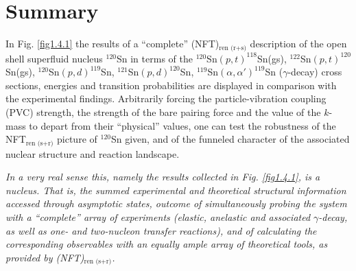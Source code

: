\section{Summary}\label{C1S11}
In Fig. \ref{fig1.4.1} the results of a ``complete'' (NFT)$_{\text{ren (r+s)}}$ description of the open shell superfluid nucleus $^{120}$Sn in terms of the $^{120}$Sn$(p,t)^{118}$Sn(gs), $^{122}$Sn$(p,t)^{120}$Sn(gs), $^{120}$Sn$(p,d)^{119}$Sn, $^{121}$Sn$(p,d)^{120}$Sn, $^{119}$Sn$(\alpha,\alpha')^{119}$Sn ($\gamma$-decay) cross sections, energies and transition probabilities are displayed in comparison with the experimental findings. 
Arbitrarily forcing the particle-vibration coupling (PVC) strength, the strength of the bare pairing force and the value of the $k$-mass to depart from their ``physical'' values, one can test the robustness  of the NFT$_{\text{ren (s+r)}}$ picture of $^{120}$Sn given, and of the  funneled character of the associated nuclear structure and reaction landscape. 










 
\textit{
In a very real sense this, namely the results collected in Fig. \ref{fig1.4.1}, is a nucleus. That is, the summed experimental and theoretical structural information accessed through asymptotic states, outcome of simultaneously  probing the system with a ``complete'' array of experiments (elastic, anelastic and associated $\gamma$-decay, as well as one- and two-nucleon transfer reactions), and of calculating the corresponding observables with an equally ample array of theoretical tools, as provided by (NFT)$_{\text{ren (s+r)}}$.}

